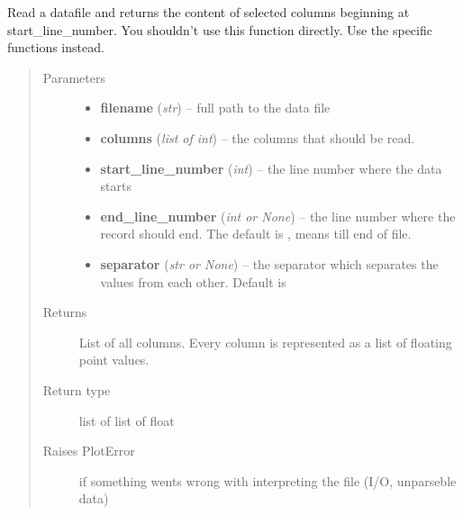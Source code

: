 \documentclass[a4paper,11pt,english]{sphinxmanual}
\begin{document}
\begin{fulllineitems}
\label{programming/utilities:samples.utils.plots.read_plot_file_beginning_at_line_number}
Read a datafile and returns the content of selected columns beginning at
start\_line\_number.  You shouldn't use this function directly. Use the
specific functions instead.
\begin{quote}\begin{description}
\item[{Parameters}] \leavevmode\begin{itemize}
\item {} 
\textbf{filename} (\emph{str}) -- full path to the data file

\item {} 
\textbf{columns} (\emph{list of int}) -- the columns that should be read.

\item {} 
\textbf{start\_line\_number} (\emph{int}) -- the line number where the data starts

\item {} 
\textbf{end\_line\_number} (\emph{int or None}) -- the line number where the record should end.
The default is , means till end of file.

\item {} 
\textbf{separator} (\emph{str or None}) -- the separator which separates the values from each other.
Default is 

\end{itemize}

\item[{Returns}] \leavevmode
List of all columns.  Every column is represented as a list of floating
point values.

\item[{Return type}] \leavevmode
list of list of float

\item[{Raises PlotError}] \leavevmode
if something wents wrong with interpreting the file (I/O,
unparseble data)

\end{description}\end{quote}

\end{fulllineitems}

\end{document}
